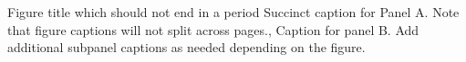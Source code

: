 








    {Figure title which should not end in a period} %
    {{
        {Succinct caption for Panel A. Note that figure captions will not split across pages.}, %
        {Caption for panel B. Add additional subpanel captions as needed depending on the figure.} %
    }}